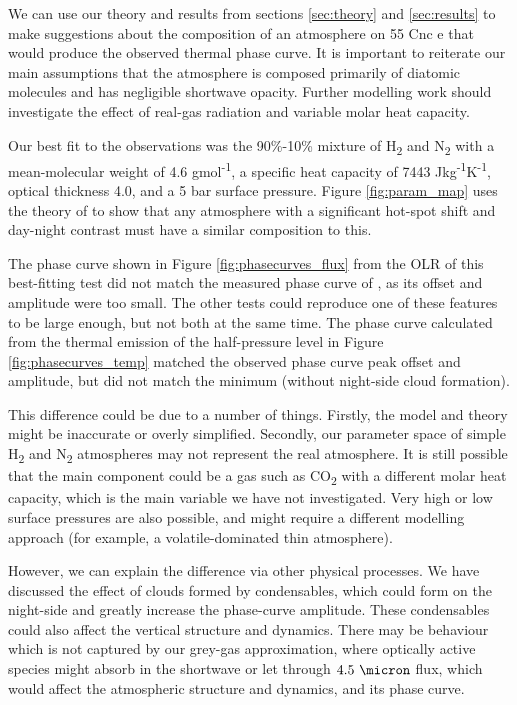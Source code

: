 We can use our theory and results from sections \ref{sec:theory} and \ref{sec:results} to make suggestions about the composition of an atmosphere on 55 Cnc e that would produce the observed thermal phase curve. It is important to reiterate our main assumptions that the atmosphere is composed primarily of diatomic molecules and has negligible shortwave opacity. Further modelling work should investigate the effect of real-gas radiation and variable molar heat capacity.

Our best fit to the observations was the 90\%-10\% mixture of H\textsubscript{2} and N\textsubscript{2} with a mean-molecular weight of 4.6 gmol\textsuperscript{-1}, a specific heat capacity of 7443 Jkg\textsuperscript{-1}K\textsuperscript{-1}, optical thickness 4.0, and a 5 bar surface pressure. Figure \ref{fig:param_map} uses the theory of \citet{zhang2016effects} to show that any atmosphere with a significant hot-spot shift and day-night contrast must have a similar composition to this.

The phase curve shown in Figure \ref{fig:phasecurves_flux} from the OLR of this best-fitting test did not match the measured phase curve of \citet{demory2016map}, as its offset and amplitude were too small. The other tests could reproduce one of these features to be large enough, but not both at the same time. The phase curve calculated from the thermal emission of the half-pressure level in Figure \ref{fig:phasecurves_temp} matched the observed phase curve peak offset and amplitude, but did not match the minimum (without night-side cloud formation).

This difference could be due to a number of things. Firstly, the model and theory might be inaccurate or overly simplified. Secondly, our parameter space of simple H\textsubscript{2} and N\textsubscript{2} atmospheres may not represent the real atmosphere. It is still possible that the main component could be a gas such as CO\textsubscript{2} with a different molar heat capacity, which is the main variable we have not investigated. Very high or low surface pressures are also possible, and might require a different modelling approach (for example, a volatile-dominated thin atmosphere).

However, we can explain the difference via other physical processes. We have discussed the effect of clouds formed by condensables, which could form on the night-side and greatly increase the phase-curve amplitude. These condensables could also affect the vertical structure and dynamics. There may be behaviour which is not captured by our grey-gas approximation, where optically active species might absorb in the shortwave or let through $4.5\ \micron$ flux, which would affect the atmospheric structure and dynamics, and its phase curve.

